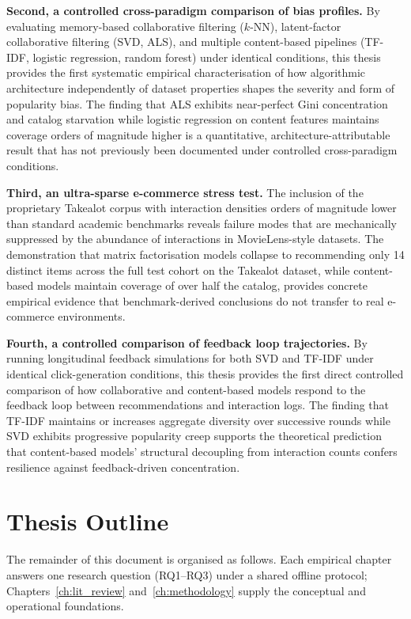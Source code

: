\documentclass[11pt,a4paper]{report}
\begin{document}
\textbf{Second, a controlled cross-paradigm comparison of bias profiles.} By evaluating memory-based collaborative filtering ($k$-NN), latent-factor collaborative filtering (SVD, ALS), and multiple content-based pipelines (TF-IDF, logistic regression, random forest) under identical conditions, this thesis provides the first systematic empirical characterisation of how algorithmic architecture independently of dataset properties shapes the severity and form of popularity bias. The finding that ALS exhibits near-perfect Gini concentration and catalog starvation while logistic regression on content features maintains coverage orders of magnitude higher is a quantitative, architecture-attributable result that has not previously been documented under controlled cross-paradigm conditions.

\textbf{Third, an ultra-sparse e-commerce stress test.} The inclusion of the proprietary Takealot corpus with interaction densities orders of magnitude lower than standard academic benchmarks reveals failure modes that are mechanically suppressed by the abundance of interactions in MovieLens-style datasets. The demonstration that matrix factorisation models collapse to recommending only 14 distinct items across the full test cohort on the Takealot dataset, while content-based models maintain coverage of over half the catalog, provides concrete empirical evidence that benchmark-derived conclusions do not transfer to real e-commerce environments.

\textbf{Fourth, a controlled comparison of feedback loop trajectories.} By running longitudinal feedback simulations for both SVD and TF-IDF under identical click-generation conditions, this thesis provides the first direct controlled comparison of how collaborative and content-based models respond to the feedback loop between recommendations and interaction logs. The finding that TF-IDF maintains or increases aggregate diversity over successive rounds while SVD exhibits progressive popularity creep supports the theoretical prediction that content-based models' structural decoupling from interaction counts confers resilience against feedback-driven concentration.

\section{Thesis Outline}
\label{sec:thesis_outline}

The remainder of this document is organised as follows. Each empirical chapter answers one research question (RQ1--RQ3) under a shared offline protocol; Chapters~\ref{ch:lit_review} and~\ref{ch:methodology} supply the conceptual and operational foundations.
\end{document}
